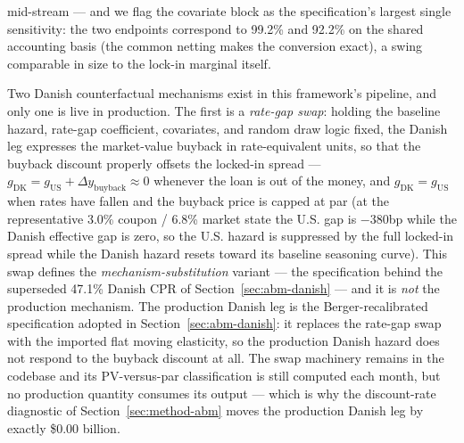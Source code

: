 \documentclass[12pt]{article}
\begin{document}
mid-stream --- and we flag the covariate block as the specification's largest single sensitivity: the two endpoints correspond to 99.2\% and 92.2\% on the shared accounting basis (the common netting makes the conversion exact), a swing comparable in size to the lock-in marginal itself.

Two Danish counterfactual mechanisms exist in this framework's pipeline, and only one is live in production. The first is a \emph{rate-gap swap}: holding the baseline hazard, rate-gap coefficient, covariates, and random draw logic fixed, the Danish leg expresses the market-value buyback in rate-equivalent units, so that the buyback discount properly offsets the locked-in spread --- $g_{\mathrm{DK}} = g_{\mathrm{US}} + \Delta y_{\mathrm{buyback}} \approx 0$ whenever the loan is out of the money, and $g_{\mathrm{DK}} = g_{\mathrm{US}}$ when rates have fallen and the buyback price is capped at par (at the representative 3.0\% coupon / 6.8\% market state the U.S. gap is $-380$bp while the Danish effective gap is zero, so the U.S. hazard is suppressed by the full locked-in spread while the Danish hazard resets toward its baseline seasoning curve). This swap defines the \emph{mechanism-substitution} variant --- the specification behind the superseded 47.1\% Danish CPR of Section~\ref{sec:abm-danish} --- and it is \emph{not} the production mechanism. The production Danish leg is the Berger-recalibrated specification adopted in Section~\ref{sec:abm-danish}: it replaces the rate-gap swap with the imported flat moving elasticity, so the production Danish hazard does not respond to the buyback discount at all. The swap machinery remains in the codebase and its PV-versus-par classification is still computed each month, but no production quantity consumes its output --- which is why the discount-rate diagnostic of Section~\ref{sec:method-abm} moves the production Danish leg by exactly \$0.00 billion.
\end{document}
